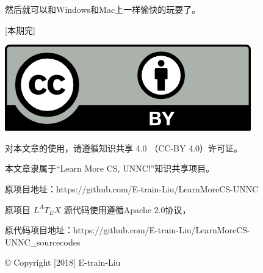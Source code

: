 \documentclass[12pt]{article}
\begin{document}
\begin{spacing}{1.4}
然后就可以和Windows和Mac上一样愉快的玩耍了。

\begin{center}
    [本期完]
\end{center}


\begin{center}
\includegraphics{by.png}

\small{

对本文章的使用，请遵循知识共享 4.0 （CC-BY 4.0）许可证。

本文章隶属于“Learn More CS, UNNC!”知识共享项目。

原项目地址：https://github.com/E-train-Liu/LearnMoreCS-UNNC

原项目 $ L ^{A} T _{E} X  $ 源代码使用遵循Apache 2.0协议，

原代码项目地址：https://github.com/E-train-Liu/LearnMoreCS-UNNC\_sourcecodes

© Copyright [2018] E-train-Liu
}
\end{center}


\end{spacing}
\end{document}
